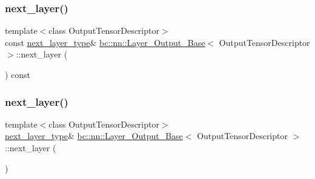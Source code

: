 \subsubsection{\texorpdfstring{next\+\_\+layer()}{next\_layer()}\hspace{0.1cm}{\footnotesize\ttfamily [1/4]}}
{\footnotesize\ttfamily template$<$class Output\+Tensor\+Descriptor$>$ \\
const \hyperlink{structbc_1_1nn_1_1Layer__Output__Base_a0c791bc57bcc78e8d82e8a5375f1c584}{next\+\_\+layer\+\_\+type}\& \hyperlink{structbc_1_1nn_1_1Layer__Output__Base}{bc\+::nn\+::\+Layer\+\_\+\+Output\+\_\+\+Base}$<$ Output\+Tensor\+Descriptor $>$\+::next\+\_\+layer (\begin{DoxyParamCaption}{ }\end{DoxyParamCaption}) const\hspace{0.3cm}{\ttfamily [inline]}}

\mbox{\label{structbc_1_1nn_1_1Layer__Output__Base_a38b80aba3c1821fbef1f5525e282c36d}} 
\subsubsection{\texorpdfstring{next\+\_\+layer()}{next\_layer()}\hspace{0.1cm}{\footnotesize\ttfamily [2/4]}}
{\footnotesize\ttfamily template$<$class Output\+Tensor\+Descriptor$>$ \\
\hyperlink{structbc_1_1nn_1_1Layer__Output__Base_a0c791bc57bcc78e8d82e8a5375f1c584}{next\+\_\+layer\+\_\+type}\& \hyperlink{structbc_1_1nn_1_1Layer__Output__Base}{bc\+::nn\+::\+Layer\+\_\+\+Output\+\_\+\+Base}$<$ Output\+Tensor\+Descriptor $>$\+::next\+\_\+layer (\begin{DoxyParamCaption}{ }\end{DoxyParamCaption})\hspace{0.3cm}{\ttfamily [inline]}}

\mbox{\label{structbc_1_1nn_1_1Layer__Output__Base_a5f43dd4ad641db100b847d33843ef837}} 
